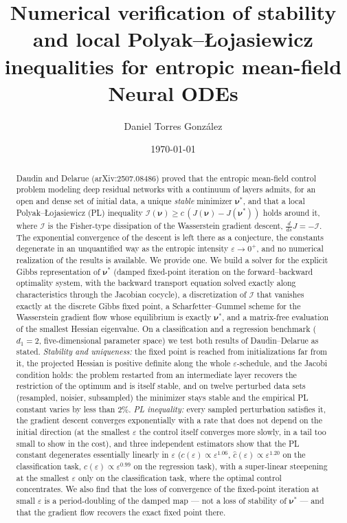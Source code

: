 \documentclass[11pt,leqno]{amsart}
\title[Numerical verification of PL inequalities for mean-field Neural ODEs]%
{Numerical verification of stability and local Polyak--\L ojasiewicz
inequalities for entropic mean-field Neural ODEs}
\author[D. Torres Gonz\'alez]{Daniel Torres Gonz\'alez}
\date{\today}
\newcommand{\cI}{\mathcal{I}}
\newcommand{\bnu}{\boldsymbol{\nu}}
\newcommand{\eps}{\varepsilon}
\numberwithin{equation}{section}
\theoremstyle{definition}
\begin{document}
\begin{abstract}
Daudin and Delarue (arXiv:2507.08486) proved that the entropic mean-field
control problem modeling deep residual networks with a continuum of layers
admits, for an open and dense set of initial data, a unique \emph{stable}
minimizer $\bnu^*$, and that a local Polyak--\L ojasiewicz (PL) inequality
$\cI(\bnu)\ge c\,(J(\bnu)-J(\bnu^*))$ holds around it, where $\cI$ is the
Fisher-type dissipation of the Wasserstein gradient descent,
$\tfrac{d}{ds}J=-\cI$.  The exponential convergence of the descent is left
there as a conjecture, the constants degenerate in an unquantified way as the
entropic intensity $\eps\to0^+$, and no numerical realization of the
results is available.  We provide one.  We build a solver for the explicit
Gibbs representation of $\bnu^*$ (damped fixed-point iteration on the
forward--backward optimality system, with the backward transport equation
solved exactly along characteristics through the Jacobian cocycle), a
discretization of $\cI$ that vanishes exactly at the discrete Gibbs fixed
point, a Scharfetter--Gummel scheme for the Wasserstein gradient flow whose
equilibrium is exactly $\bnu^*$, and a matrix-free evaluation of the smallest
Hessian eigenvalue.  On a classification and a regression benchmark
($d_1=2$, five-dimensional parameter space) we test both results of
Daudin--Delarue as stated.  \emph{Stability and uniqueness:} the fixed point
is reached from initializations far from it, the projected Hessian is
positive definite along the whole $\eps$-schedule, and the Jacobi
condition holds: the problem restarted from an intermediate layer recovers
the restriction of the optimum and is itself stable, and on twelve
perturbed data sets (resampled, noisier, subsampled) the minimizer stays
stable and the empirical PL constant varies by less than $2\%$.
\emph{PL inequality:}
every sampled perturbation satisfies it, the gradient descent converges
exponentially with a rate that does not depend on the initial direction
(at the smallest $\eps$ the control itself converges more slowly, in a
tail too small to show in the cost), and
three independent estimators show that the PL constant degenerates
essentially linearly in $\eps$ ($c(\eps)\propto\eps^{1.06}$,
$\hat c(\eps)\propto\eps^{1.20}$ on the classification task,
$c(\eps)\propto\eps^{0.99}$ on the regression task), with a super-linear
steepening at the smallest $\eps$ only on the classification task, where
the optimal control concentrates.  We also find that the loss of convergence of the
fixed-point iteration at small $\eps$ is a period-doubling of the damped map
--- not a loss of stability of $\bnu^*$ --- and that the gradient flow
recovers the exact fixed point there.
\end{abstract}
\end{document}

